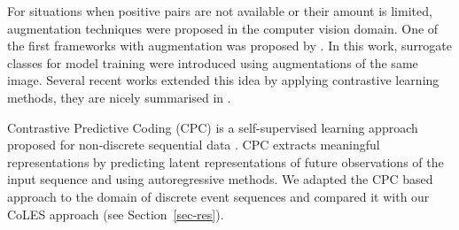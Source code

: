 \documentclass[sigconf, anonymous]{acmart}
\begin{document}
For situations when positive pairs are not available or their amount is limited, augmentation techniques were proposed in the computer vision domain. One of the first frameworks with augmentation  was proposed by \citep{Dosovitskiy2014DiscriminativeUF}. In this work, surrogate classes for model training were introduced using augmentations of the same image. Several recent works \citep{Bachman2019LearningRB, He2019MomentumCF, Chen2020ASF} extended this idea by applying contrastive learning methods, they are nicely summarised in \citep{Falcon2020AFF}.

Contrastive Predictive Coding (CPC) is a self-supervised learning approach proposed for non-discrete sequential data \citep{Oord2018RepresentationLW}. CPC extracts meaningful representations by predicting latent representations of future observations of the input sequence and using autoregressive methods.
We adapted the CPC based approach to the domain of discrete event sequences and compared it with our CoLES approach (see Section~\ref{sec-res}).


\end{document}
